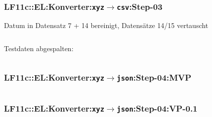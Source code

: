 \begin{frame}[fragile]  
  \frametitle{LF11c::EL:Konverter:\texttt{xyz$\rightarrow$csv}:Step-03} 

  \begin{footnotesize}
   Datum in Datensatz  7 + 14 bereinigt, Datensätze 14/15 vertauscht 
  \end{footnotesize}

  \begin{center}
  \begin{minipage}{0.8\textwidth}
    \inputminted [fontsize=\footnotesize]{python}{\dspLf/dsp.teta-c.csv}
  \end{minipage} 
  \end{center}

  \begin{footnotesize}
   Testdaten abgespalten: 
  \end{footnotesize}

  \begin{center}
  \begin{minipage}{0.8\textwidth}
    \inputminted [fontsize=\footnotesize]{python}{\dspLf/dsp.teta-t.csv}
  \end{minipage} 
  \end{center}


\end{frame}

\begin{frame}[fragile]  
  \frametitle{LF11c::EL:Konverter:\texttt{xyz$\rightarrow$json}:Step-04:MVP} 

  \begin{center}
  \begin{minipage}{0.8\textwidth}
    \inputminted [fontsize=\tiny,linenos]{python}{\snpLf/dsp-teta-conv-mvp.py}
  \end{minipage}
  \end{center}
\end{frame}


\begin{frame}[fragile]  
  \frametitle{LF11c::EL:Konverter:\texttt{xyz$\rightarrow$json}:Step-04:VP-0.1} 

  \begin{center}
  \begin{minipage}{0.8\textwidth}
    \inputminted [fontsize=\tiny,linenos]{python}{\snpLf/dsp-teta-conv-vp01.py}
  \end{minipage}
  \end{center}
\end{frame}

